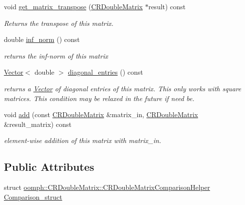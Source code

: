 \begin{DoxyCompactItemize}
void \hyperlink{classoomph_1_1CRDoubleMatrix_a82cb428139f7c35a7c62a09fad38eecb}{get\+\_\+matrix\+\_\+transpose} (\hyperlink{classoomph_1_1CRDoubleMatrix}{C\+R\+Double\+Matrix} $\ast$result) const
\begin{DoxyCompactList}\small\item\em Returns the transpose of this matrix. \end{DoxyCompactList}\item 
double \hyperlink{classoomph_1_1CRDoubleMatrix_a6cd938ba5f026f1508239cef05b16cb4}{inf\+\_\+norm} () const
\begin{DoxyCompactList}\small\item\em returns the inf-\/norm of this matrix \end{DoxyCompactList}\item 
\hyperlink{classoomph_1_1Vector}{Vector}$<$ double $>$ \hyperlink{classoomph_1_1CRDoubleMatrix_ad438e693468cd0ae179460eafcaab038}{diagonal\+\_\+entries} () const
\begin{DoxyCompactList}\small\item\em returns a \hyperlink{classoomph_1_1Vector}{Vector} of diagonal entries of this matrix. This only works with square matrices. This condition may be relaxed in the future if need be. \end{DoxyCompactList}\item 
void \hyperlink{classoomph_1_1CRDoubleMatrix_a57f88253acfa87a764652c06c1bdc362}{add} (const \hyperlink{classoomph_1_1CRDoubleMatrix}{C\+R\+Double\+Matrix} \&matrix\+\_\+in, \hyperlink{classoomph_1_1CRDoubleMatrix}{C\+R\+Double\+Matrix} \&result\+\_\+matrix) const
\begin{DoxyCompactList}\small\item\em element-\/wise addition of this matrix with matrix\+\_\+in. \end{DoxyCompactList}\end{DoxyCompactItemize}
\subsection*{Public Attributes}
\begin{DoxyCompactItemize}
\item 
struct \hyperlink{structoomph_1_1CRDoubleMatrix_1_1CRDoubleMatrixComparisonHelper}{oomph\+::\+C\+R\+Double\+Matrix\+::\+C\+R\+Double\+Matrix\+Comparison\+Helper} \hyperlink{classoomph_1_1CRDoubleMatrix_aabbc88e0f4806702ff260dcc458632d2}{Comparison\+\_\+struct}
\end{DoxyCompactItemize}

